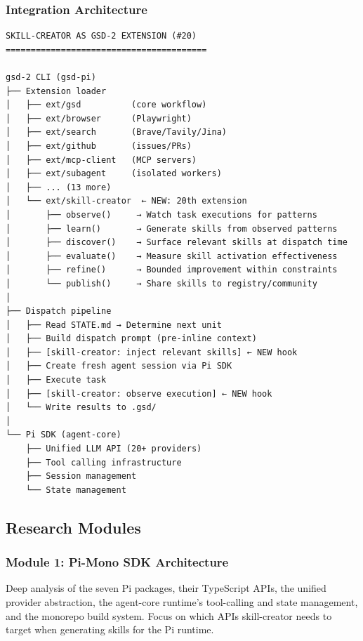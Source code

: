 \documentclass[11pt,letterpaper]{article}
\begin{document}
\subsubsection{Integration Architecture}

\begin{asciibox}
\begin{verbatim}
SKILL-CREATOR AS GSD-2 EXTENSION (#20)
========================================

gsd-2 CLI (gsd-pi)
├── Extension loader
│   ├── ext/gsd          (core workflow)
│   ├── ext/browser      (Playwright)
│   ├── ext/search       (Brave/Tavily/Jina)
│   ├── ext/github       (issues/PRs)
│   ├── ext/mcp-client   (MCP servers)
│   ├── ext/subagent     (isolated workers)
│   ├── ... (13 more)
│   └── ext/skill-creator  ← NEW: 20th extension
│       ├── observe()     → Watch task executions for patterns
│       ├── learn()       → Generate skills from observed patterns
│       ├── discover()    → Surface relevant skills at dispatch time
│       ├── evaluate()    → Measure skill activation effectiveness
│       ├── refine()      → Bounded improvement within constraints
│       └── publish()     → Share skills to registry/community
│
├── Dispatch pipeline
│   ├── Read STATE.md → Determine next unit
│   ├── Build dispatch prompt (pre-inline context)
│   ├── [skill-creator: inject relevant skills] ← NEW hook
│   ├── Create fresh agent session via Pi SDK
│   ├── Execute task
│   ├── [skill-creator: observe execution] ← NEW hook
│   └── Write results to .gsd/
│
└── Pi SDK (agent-core)
    ├── Unified LLM API (20+ providers)
    ├── Tool calling infrastructure
    ├── Session management
    └── State management
\end{verbatim}
\end{asciibox}

\subsection{Research Modules}

\subsubsection{Module 1: Pi-Mono SDK Architecture}
Deep analysis of the seven Pi packages, their TypeScript APIs, the unified provider abstraction, the agent-core runtime's tool-calling and state management, and the monorepo build system. Focus on which APIs skill-creator needs to target when generating skills for the Pi runtime.
\end{document}
